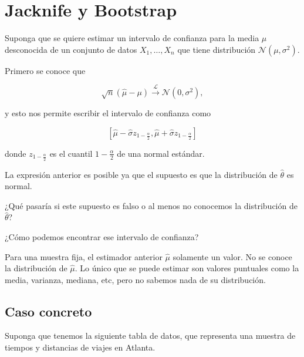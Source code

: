 \documentclass[
  12pt,
]{book}
\theoremstyle{definition}
\theoremstyle{definition}
\theoremstyle{definition}
\theoremstyle{remark}
\let\BeginKnitrBlock\begin \let\EndKnitrBlock\end
\begin{document}
\hypertarget{jacknife-y-bootstrap}{%
\chapter{Jacknife y Bootstrap}\label{jacknife-y-bootstrap}}

Suponga que se quiere estimar un intervalo de confianza para la media
\(\mu\) desconocida de un conjunto de datos \(X_{1},\ldots, X_{n}\)
que tiene distribución \(\mathcal{N}\left(\mu ,\sigma^{2}\right)\).

Primero se conoce que

\begin{equation*}
\sqrt{n}\left( \hat{\mu} - \mu \right)
\xrightarrow{\mathcal{L}} \mathcal{N}\left(0,\sigma^{2}\right),
\end{equation*}

y esto nos permite escribir el intervalo de confianza como

\begin{equation*}
\left[ \hat{\mu} - \hat{\sigma}z_{1-\frac{\alpha}{2}} ,
\hat{\mu} + \hat{\sigma}z_{1-\frac{\alpha}{2}}\right]
\end{equation*}

donde \(z_{1-\frac{\alpha}{2}}\) es el cuantil \(1-\frac{\alpha}{2}\)
de una normal estándar.

La expresión anterior es posible ya que el supuesto es que la
distribución de \(\hat{\theta}\) es normal.

\BeginKnitrBlock{remark}
{}¿Qué pasaría si este supuesto es falso o al menos no conocemos la
distribución de \(\hat{\theta}\)?

¿Cómo podemos encontrar ese intervalo de confianza?
\EndKnitrBlock{remark}

\BeginKnitrBlock{remark}
{}Para una muestra fija, el estimador anterior \(\hat{\mu}\)
solamente un valor. No se conoce la distribución de \(\hat{\mu}\). Lo
único que se puede estimar son valores puntuales como la media,
varianza, mediana, etc, pero no sabemos nada de su distribución.
\EndKnitrBlock{remark}

\hypertarget{caso-concreto}{%
\section{Caso concreto}\label{caso-concreto}}

Suponga que tenemos la siguiente tabla de datos, que representa una
muestra de tiempos y distancias de viajes en Atlanta.
\end{document}
